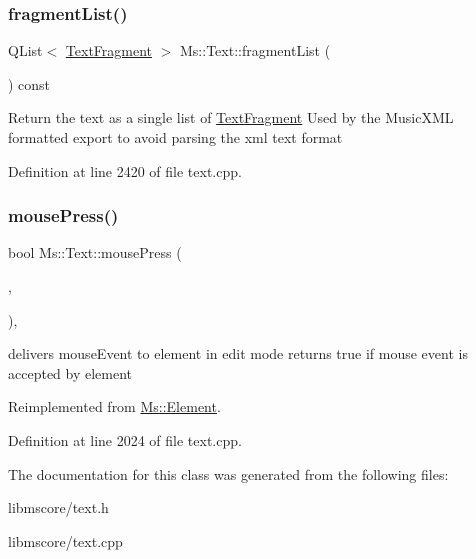 \mbox{\label{class_ms_1_1_text_a3065b94e86b14e7dcf0ee4dff467710c}} 
\subsubsection{\texorpdfstring{fragment\+List()}{fragmentList()}}
{\footnotesize\ttfamily Q\+List$<$ \hyperlink{class_ms_1_1_text_fragment}{Text\+Fragment} $>$ Ms\+::\+Text\+::fragment\+List (\begin{DoxyParamCaption}{ }\end{DoxyParamCaption}) const}

Return the text as a single list of \hyperlink{class_ms_1_1_text_fragment}{Text\+Fragment} Used by the Music\+X\+ML formatted export to avoid parsing the xml text format 

Definition at line 2420 of file text.\+cpp.

\mbox{\label{class_ms_1_1_text_a39d82a468510e394017eb10fb9bc3e63}} 
\subsubsection{\texorpdfstring{mouse\+Press()}{mousePress()}}
{\footnotesize\ttfamily bool Ms\+::\+Text\+::mouse\+Press (\begin{DoxyParamCaption}\item[{\hyperlink{class_ms_1_1_edit_data}{Edit\+Data} \&}]{,  }\item[{Q\+Mouse\+Event $\ast$}]{ }\end{DoxyParamCaption})\hspace{0.3cm}{\ttfamily [override]}, {\ttfamily [virtual]}}

delivers mouse\+Event to element in edit mode returns true if mouse event is accepted by element 

Reimplemented from \hyperlink{class_ms_1_1_element_a794cd19d8af68dde867bab5a0bf75344}{Ms\+::\+Element}.



Definition at line 2024 of file text.\+cpp.



The documentation for this class was generated from the following files\+:\begin{DoxyCompactItemize}
\item 
libmscore/text.\+h\item 
libmscore/text.\+cpp\end{DoxyCompactItemize}
